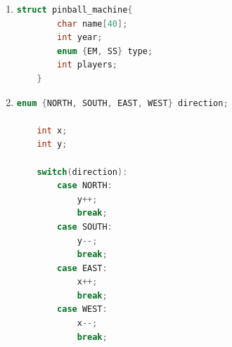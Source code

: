 \documentclass[12pt]{article}
\begin{document}
\begin{enumerate}[1.]
\begin{enumerate}[a)]
        \bigskip

        \texttt{typedef enum \{EMPTY, PAWN, KNIGHT, BISHOP, ROOK, QUEEN, KING\} Piece;}

        \bigskip

        \texttt{typedef enum \{BLACK, WHITE\} Color;}

        \item

\begin{lstlisting}[language=c]
    typedef struct {
        Piece piece;
        Color color;
    } Square;
\end{lstlisting}

        \item

\begin{lstlisting}[language=c]
    Square board[8][8] =
    {
        { {ROOK, WHITE},{KNIGHT, WHITE},{BISHOP, WHITE},{KING, WHITE},{QUEEN, WHITE},{BISHOP, WHITE},{KNIGHT, WHITE},{ROOK, WHITE} },
        { {PAWN, WHITE},{PAWN, WHITE},{PAWN, WHITE},{PAWN, WHITE},{PAWN, WHITE},{PAWN, WHITE},{PAWN, WHITE},{PAWN, WHITE} },
        { {},{},{},{},{},{},{},{} },
        { {},{},{},{},{},{},{},{} },
        { {},{},{},{},{},{},{},{} },
        { {},{},{},{},{},{},{},{} },
        { {PAWN, BLACK},{PAWN, BLACK},{PAWN, BLACK},{PAWN, BLACK},{PAWN, BLACK},{PAWN, BLACK},{PAWN, BLACK},{PAWN, BLACK} },
        { {ROOK, BLACK},{KNIGHT, BLACK},{BISHOP, BLACK},{QUEEN, BLACK},{KING, BLACK},{BISHOP, BLACK},{KNIGHT, BLACK},{ROOK, BLACK} },
    };
\end{lstlisting}
    \end{enumerate}

        \item

\begin{lstlisting}[language=c]
    struct pinball_machine{
        char name[40];
        int year;
        enum {EM, SS} type;
        int players;
    }
\end{lstlisting}

        \item

\begin{lstlisting}[language=c]
    enum {NORTH, SOUTH, EAST, WEST} direction;

    int x;
    int y;

    switch(direction):
        case NORTH:
            y++;
            break;
        case SOUTH:
            y--;
            break;
        case EAST:
            x++;
            break;
        case WEST:
            x--;
            break;
\end{lstlisting}


\end{enumerate}
\end{document}
